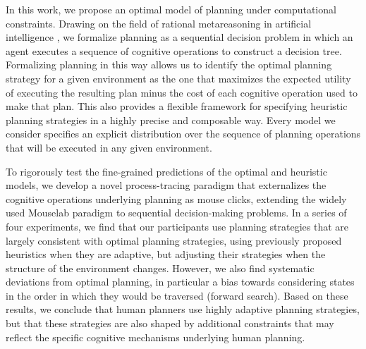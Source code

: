 In this work, we propose an optimal model of planning under computational constraints. Drawing on the field of rational metareasoning in artificial intelligence \citep{matheson1968economic,horvitz1987reasoning,russell1991principles}, we formalize planning as a sequential decision problem in which an agent executes a sequence of cognitive operations to construct a decision tree. Formalizing planning in this way allows us to identify the optimal planning strategy for a given environment as the one that maximizes the expected utility of executing the resulting plan minus the cost of each cognitive operation used to make that plan. This also provides a flexible framework for specifying heuristic planning strategies in a highly precise and composable way. Every model we consider specifies an explicit distribution over the sequence of planning operations that will be executed in any given environment.

To rigorously test the fine-grained predictions of the optimal and heuristic models, we develop a novel process-tracing paradigm that externalizes the cognitive operations underlying planning as mouse clicks, extending the widely used Mouselab paradigm \citep{payne1976task} to sequential decision-making problems. In a series of four experiments, we find that our participants use planning strategies that are largely consistent with optimal planning strategies, using previously proposed heuristics when they are adaptive, but adjusting their strategies when the structure of the environment changes. However, we also find systematic deviations from optimal planning, in particular a bias towards considering states in the order in which they would be traversed (forward search). Based on these results, we conclude that human planners use highly adaptive planning strategies, but that these strategies are also shaped by additional constraints that may reflect the specific cognitive mechanisms underlying human planning.

